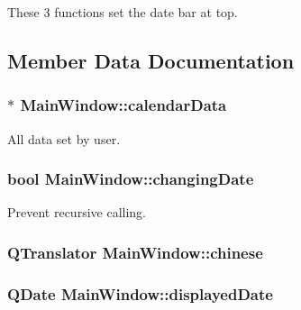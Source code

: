 These 3 functions set the date bar at top. 



\subsection{Member Data Documentation}
\subsubsection[{\texorpdfstring{calendar\+Data}{calendarData}}]{$\ast$ Main\+Window\+::calendar\+Data}\hypertarget{classMainWindow_a4344962e43608c8c9f1b03e98eaa9283}{}\label{classMainWindow_a4344962e43608c8c9f1b03e98eaa9283}


All data set by user. 

\subsubsection[{\texorpdfstring{changing\+Date}{changingDate}}]{\setlength{\rightskip}{0pt plus 5cm}bool Main\+Window\+::changing\+Date\hspace{0.3cm}{\ttfamily [private]}}\hypertarget{classMainWindow_a4ba1fa11c17bc9919783f8988f0f6e92}{}\label{classMainWindow_a4ba1fa11c17bc9919783f8988f0f6e92}


Prevent recursive calling. 

\subsubsection[{\texorpdfstring{chinese}{chinese}}]{\setlength{\rightskip}{0pt plus 5cm}Q\+Translator Main\+Window\+::chinese\hspace{0.3cm}{\ttfamily [private]}}\hypertarget{classMainWindow_a2c428c740faa1094e20f658b2db84dc7}{}\label{classMainWindow_a2c428c740faa1094e20f658b2db84dc7}
\subsubsection[{\texorpdfstring{displayed\+Date}{displayedDate}}]{\setlength{\rightskip}{0pt plus 5cm}Q\+Date Main\+Window\+::displayed\+Date\hspace{0.3cm}{\ttfamily [private]}}\hypertarget{classMainWindow_a3d53fc161132967689d4dde0ad7f8a21}{}\label{classMainWindow_a3d53fc161132967689d4dde0ad7f8a21}


